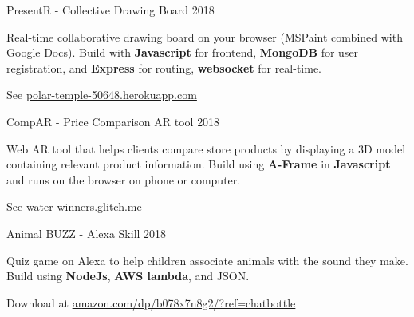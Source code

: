 

\begin{cventries}

  \cventry
    {PresentR - Collective Drawing Board} %
    {} %
    {} %
    {2018} %
    {
      \begin{cvitems} %
        \item {Real-time collaborative drawing board on your browser (MSPaint combined with Google Docs). Build with \textbf{Javascript} for frontend, \textbf{MongoDB} for user registration, and \textbf{Express} for routing, \textbf{websocket} for real-time.}
        \item {See \href{http://polar-temple-50648.herokuapp.com}{polar-temple-50648.herokuapp.com}}
      \end{cvitems}
    }

  \cventry
    {CompAR - Price Comparison AR tool} %
    {} %
    {} %
    {2018} %
    {
      \begin{cvitems} %
        \item {Web AR tool that helps clients compare store products by displaying a 3D model containing relevant product information. Build using \textbf{A-Frame} in \textbf{Javascript} and runs on the browser on phone or computer.}
        \item {See \href{http://water-winners.glitch.me}{water-winners.glitch.me}}
      \end{cvitems}
    }

  \cventry
    {Animal BUZZ - Alexa Skill} %
    {} %
    {} %
    {2018} %
    {
      \begin{cvitems} %
        \item {Quiz game on Alexa to help children associate animals with the sound they make. Build using \textbf{NodeJs}, \textbf{AWS lambda}, and JSON.}
        \item {Download at \href{http://www.amazon.com/dp/b078x7n8g2/?ref=chatbottle}{amazon.com/dp/b078x7n8g2/?ref=chatbottle}}
      \end{cvitems}
    }


\end{cventries}
